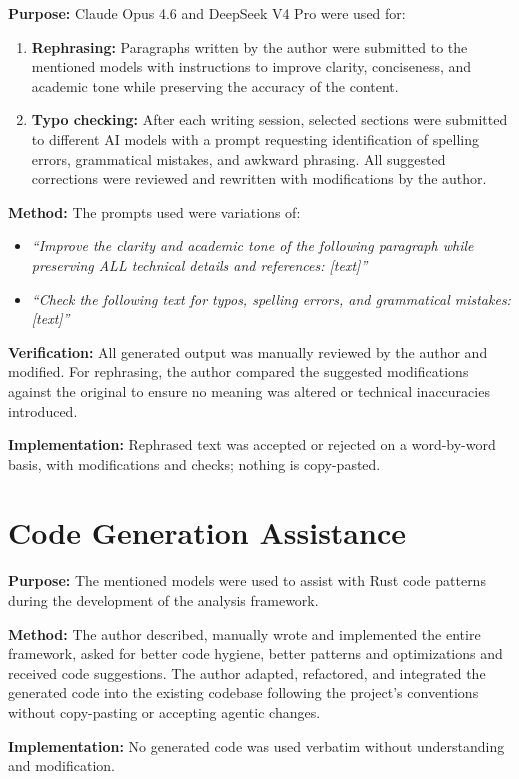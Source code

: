 \documentclass[12pt,a4paper]{book}
\theoremstyle{definition}
\theoremstyle{remark}
\begin{document}
\textbf{Purpose:} Claude Opus 4.6 and DeepSeek V4 Pro were used for:
\begin{enumerate}[leftmargin=*,itemsep=1pt]
    \item \textbf{Rephrasing:} Paragraphs written by the author were submitted to the mentioned models with instructions to improve clarity, conciseness, and academic tone while preserving the accuracy of the content.
    \item \textbf{Typo checking:} After each writing session, selected sections were submitted to different AI models with a prompt requesting identification of spelling errors, grammatical mistakes, and awkward phrasing. All suggested corrections were reviewed and rewritten with modifications by the author.
\end{enumerate}

\textbf{Method:} The prompts used were variations of:
\begin{itemize}[leftmargin=*,itemsep=1pt]
    \item \textit{``Improve the clarity and academic tone of the following paragraph while preserving ALL technical details and references: [text]''}
    \item \textit{``Check the following text for typos, spelling errors, and grammatical mistakes: [text]''}
\end{itemize}

\textbf{Verification:} All generated output was manually reviewed by the author and modified. For rephrasing, the author compared the suggested modifications against the original to ensure no meaning was altered or technical inaccuracies introduced.

\textbf{Implementation:} Rephrased text was accepted or rejected on a word-by-word basis, with modifications and checks; nothing is copy-pasted.


\section{Code Generation Assistance}

\textbf{Purpose:} The mentioned models were used to assist with Rust code patterns during the development of the analysis framework.

\textbf{Method:} The author described, manually wrote and implemented the entire framework, asked for better code hygiene, better patterns and optimizations and received code suggestions. The author adapted, refactored, and integrated the generated code into the existing codebase following the project's conventions without copy-pasting or accepting agentic changes.

\textbf{Implementation:} No generated code was used verbatim without understanding and modification.
\end{document}

